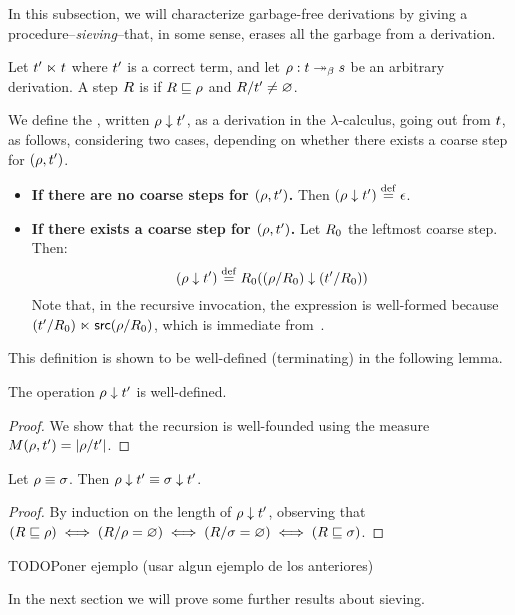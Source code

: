 
In this subsection, we will characterize garbage-free derivations by giving
a procedure--\emph{sieving}--that, in some sense, erases all the garbage from a derivation.

\begin{definition}[Sieving]
Let $t' \mathrel{\ltimes} t$ where $t'$ is a correct term,
and let $\rho : t \mathrel{\twoheadrightarrow_\beta} s$ be an arbitrary derivation.
A step $R$ is  if
$R \sqsubseteq \rho$ and $R/t' \neq \varnothing$.

We define the ,
written $\rho \downarrow t'$, as a derivation in the $\lambda$-calculus,
going out from $t$, as follows, considering two cases, depending on whether there exists a
coarse step for $(\rho,t')$.
\begin{itemize}
\item {\bf If there are no coarse steps for $(\rho,t')$.}
  Then
  $(\rho \downarrow t') \overset{\mathrm{def}}{=} \epsilon$.
\item {\bf If there exists a coarse step for $(\rho,t')$.}
  Let $R_0$ the leftmost coarse step.
  Then:
  \[
    (\rho \downarrow t') \overset{\mathrm{def}}{=} R_0 ((\rho/R_0) \downarrow (t'/R_0))
  \]
  Note that, in the recursive invocation, the expression is well-formed because
  $(t'/R_0) \mathrel{\ltimes} \mathsf{src}(\rho/R_0)$,
  which is immediate from~.
\end{itemize}
This definition is shown to be well-defined (terminating) in the following lemma.
\end{definition}

\begin{lemma}
The operation $\rho \downarrow t'$ is well-defined.
\end{lemma}
\begin{proof}
We show that the recursion is well-founded using the measure
  $M(\rho,t') = |\rho/t'|$.
\end{proof}

\begin{lemma}
Let $\rho \equiv \sigma$. Then $\rho \downarrow t' \equiv \sigma \downarrow t'$.
\end{lemma}
\begin{proof}
By induction on the length of $\rho \downarrow t'$, observing that
$(R \sqsubseteq \rho) \iff (R/\rho = \varnothing) \iff (R/\sigma = \varnothing) \iff (R \sqsubseteq \sigma)$.
\end{proof}

\begin{example}
TODO{Poner ejemplo (usar algun ejemplo de los anteriores)}
\end{example}

In the next section we will prove some further results about sieving.
